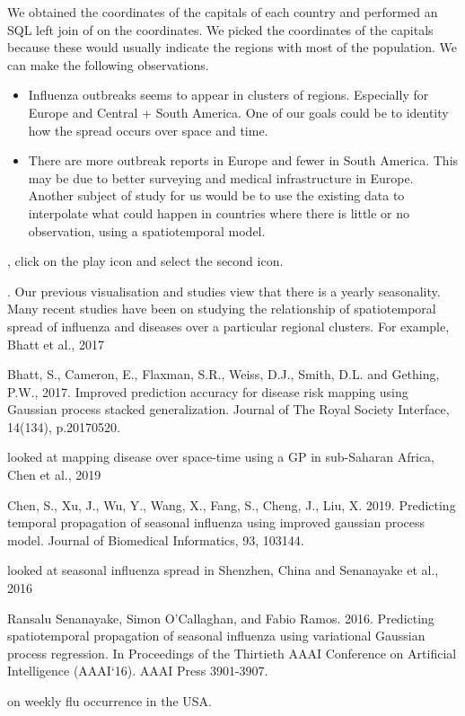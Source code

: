 \documentclass[letterpaper,10pt,english]{sphinxmanual}
\begin{document}
We obtained the coordinates of the capitals of each country and performed an SQL left join of  on
the coordinates. We picked the coordinates of the capitals because these would usually indicate the regions with
most of the population. We can make the following observations.
\begin{itemize}
\item {} 
Influenza outbreaks seems to appear in clusters of regions. Especially for Europe and Central + South America. One of our goals could be to identity how the spread occurs over space and time.

\item {} 
There are more outbreak reports in Europe and fewer in South America. This may be due to better surveying and medical infrastructure in Europe. Another subject of study for us would be to use the existing data to interpolate what could happen in countries where there is little or no observation, using a spatiotemporal model.

\end{itemize}

, click on the play icon and select the second icon.



. Our previous visualisation and studies view that there is a yearly seasonality. Many recent studies have been
on studying the relationship of spatiotemporal spread of influenza and diseases over a particular regional clusters.
For example, Bhatt et al., 2017 %
\begin{footnote}[10]\sphinxAtStartFootnote
Bhatt, S., Cameron, E., Flaxman, S.R., Weiss, D.J., Smith, D.L. and Gething, P.W., 2017. Improved prediction accuracy for disease risk mapping using Gaussian process stacked generalization. Journal of The Royal Society Interface, 14(134), p.20170520.
%
\end{footnote} looked at mapping disease over space-time using a GP in sub-Saharan Africa,
Chen et al., 2019 %
\begin{footnote}[9]\sphinxAtStartFootnote
Chen, S., Xu, J., Wu, Y., Wang, X., Fang, S., Cheng, J., Liu, X. 2019. Predicting temporal propagation of seasonal influenza using improved gaussian process model. Journal of Biomedical Informatics, 93, 103144. 
%
\end{footnote} looked at seasonal influenza spread in Shenzhen, China and Senanayake et al., 2016 %
\begin{footnote}[12]\sphinxAtStartFootnote
Ransalu Senanayake, Simon O’Callaghan, and Fabio Ramos. 2016. Predicting spatio\textendash{}temporal propagation of seasonal influenza using variational Gaussian process regression. In Proceedings of the Thirtieth AAAI Conference on Artificial Intelligence (AAAI‘16). AAAI Press 3901-3907.
%
\end{footnote} on weekly flu
occurrence in the USA.
\end{document}
